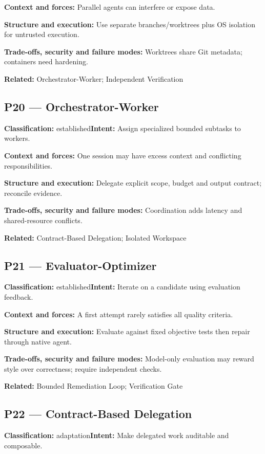 \documentclass[11pt,letterpaper]{article}
\begin{document}
\textbf{Context and forces:} Parallel agents can interfere or expose data.

\textbf{Structure and execution:} Use separate branches/worktrees plus OS isolation for untrusted execution.

\textbf{Trade-offs, security and failure modes:} Worktrees share Git metadata; containers need hardening.

\textbf{Related:} Orchestrator-Worker; Independent Verification

\subsection*{P20 --- Orchestrator-Worker}
\textbf{Classification:} established\quad\textbf{Intent:} Assign specialized bounded subtasks to workers.

\textbf{Context and forces:} One session may have excess context and conflicting responsibilities.

\textbf{Structure and execution:} Delegate explicit scope, budget and output contract; reconcile evidence.

\textbf{Trade-offs, security and failure modes:} Coordination adds latency and shared-resource conflicts.

\textbf{Related:} Contract-Based Delegation; Isolated Workspace

\subsection*{P21 --- Evaluator-Optimizer}
\textbf{Classification:} established\quad\textbf{Intent:} Iterate on a candidate using evaluation feedback.

\textbf{Context and forces:} A first attempt rarely satisfies all quality criteria.

\textbf{Structure and execution:} Evaluate against fixed objective tests then repair through native agent.

\textbf{Trade-offs, security and failure modes:} Model-only evaluation may reward style over correctness; require independent checks.

\textbf{Related:} Bounded Remediation Loop; Verification Gate

\subsection*{P22 --- Contract-Based Delegation}
\textbf{Classification:} adaptation\quad\textbf{Intent:} Make delegated work auditable and composable.
\end{document}
